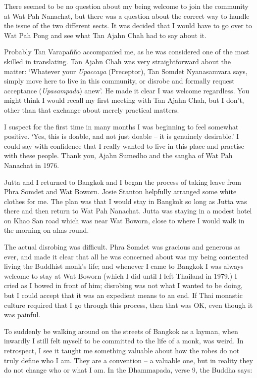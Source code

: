 There seemed to be no question about my being welcome to join the
community at Wat Pah Nanachat, but there was a question about the
correct way to handle the issue of the two different sects. It was
decided that I would have to go over to Wat Pah Pong and see what Tan
Ajahn Chah had to say about it.

Probably Tan Varapañño accompanied me, as he was considered one of the
most skilled in translating. Tan Ajahn Chah was very straightforward
about the matter: `Whatever your \emph{Upaccaya} (Preceptor), Tan Somdet
Nyanasamvara says, simply move here to live in this community, or
disrobe and formally request acceptance (\emph{Upasampada}) anew'. He
made it clear I was welcome regardless. You might think I would recall
my first meeting with Tan Ajahn Chah, but I don't, other than that
exchange about merely practical matters.

I suspect for the first time in many months I was beginning to feel
somewhat positive. `Yes, this is doable, and not just doable -- it is
genuinely desirable.' I could say with confidence that I really wanted
to live in this place and practise with these people. Thank you, Ajahn
Sumedho and the sangha of Wat Pah Nanachat in 1976.

Jutta and I returned to Bangkok and I began the process of taking leave
from Phra Somdet and Wat Boworn. Josie Stanton helpfully arranged some
white clothes for me. The plan was that I would stay in Bangkok so long
as Jutta was there and then return to Wat Pah Nanachat. Jutta was
staying in a modest hotel on Khao San road which was near Wat Boworn,
close to where I would walk in the morning on alms-round.

The actual disrobing was difficult. Phra Somdet was gracious and
generous as ever, and made it clear that all he was concerned about was
my being contented living the Buddhist monk's life; and whenever I came
to Bangkok I was always welcome to stay at Wat Boworn (which I did until
I left Thailand in 1979.) I cried as I bowed in front of him; disrobing
was not what I wanted to be doing, but I could accept that it was an
expedient means to an end. If Thai monastic culture required that I go
through this process, then that was OK, even though it was painful.

To suddenly be walking around on the streets of Bangkok as a layman,
when inwardly I still felt myself to be committed to the life of a monk,
was weird. In retrospect, I see it taught me something valuable about
how the robes do not truly define who I am. They are a convention -- a
valuable one, but in reality they do not change who or what I am. In the
Dhammapada, verse 9, the Buddha says:

